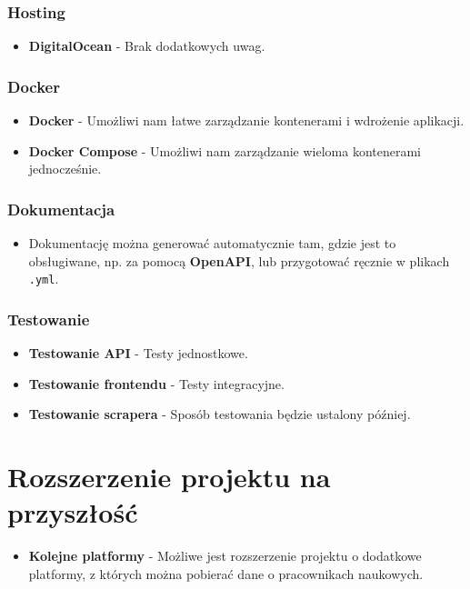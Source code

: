 \documentclass{article}
\begin{document}
\subsubsection{Hosting}
\begin{itemize}
  \item \textbf{DigitalOcean} - Brak dodatkowych uwag.
\end{itemize}

\subsubsection{Docker}
\begin{itemize}
  \item \textbf{Docker} - Umożliwi nam łatwe zarządzanie kontenerami i wdrożenie aplikacji.
  \item \textbf{Docker Compose} - Umożliwi nam zarządzanie wieloma kontenerami jednocześnie.
\end{itemize}

\subsubsection{Dokumentacja}
\begin{itemize}
  \item Dokumentację można generować automatycznie tam, gdzie jest to obsługiwane, np. za pomocą \textbf{OpenAPI}, lub przygotować ręcznie w plikach \texttt{.yml}.
\end{itemize}

\subsubsection{Testowanie}
\begin{itemize}
  \item \textbf{Testowanie API} - Testy jednostkowe.
  \item \textbf{Testowanie frontendu} - Testy integracyjne.
  \item \textbf{Testowanie scrapera} - Sposób testowania będzie ustalony później.
\end{itemize}
\newpage
\section{Rozszerzenie projektu na przyszłość}
\begin{itemize}
  \item \textbf{Kolejne platformy} - Możliwe jest rozszerzenie projektu o dodatkowe platformy, z których można pobierać dane o pracownikach naukowych.
\end{itemize}
\end{document}
